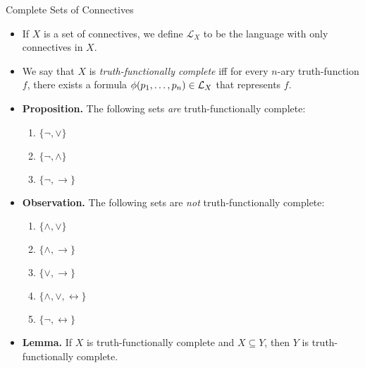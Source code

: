 \documentclass[../slides.tex]{subfiles}
\begin{document}
\begin{frame}{Complete Sets of Connectives}

  \begin{itemize}
  \item If $X$ is a set of connectives, we define $\mathcal{L}_X$ to
    be the language with only connectives in $X$.

    \item We say that $X$ is \emph{truth-functionally
        complete} iff for every $n$-ary truth-function $f$, there
        exists a formula $\phi(p_1, \mathellipsis,
        p_n)\in\mathcal{L}_X$ that represents $f$.

      \item \textbf{Proposition.} The following sets \emph{are}
        truth-functionally complete:
        \begin{enumerate}[1.]
        \item $\{\neg,\lor\}$
        \item $\{\neg,\land\}$
        \item $\{\neg, \to\}$
        \end{enumerate}
      \item \textbf{Observation.} The following sets are \emph{not}
        truth-functionally complete:
        \begin{enumerate}[1.]
        \item $\{\land,\lor\}$
        \item $\{\land,\to\}$
        \item $\{\lor, \to\}$
        \item $\{\land,\lor,\leftrightarrow\}$
        \item $\{\neg, \leftrightarrow\}$
        \end{enumerate}
        \item \textbf{Lemma.} If $X$ is truth-functionally
          complete and $X\subseteq Y$, then $Y$ is truth-functionally complete.
  \end{itemize}
  
\end{frame}
\end{document}
